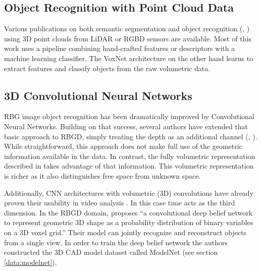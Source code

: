\documentclass[10pt,twocolumn,letterpaper]{article}
\begin{document}



\subsection{Object Recognition with Point Cloud Data}
Various publications on both semantic segmentation \cite{koppula2011semantic} and object recognition 
(\cite{teichman2011towards}, \cite{golovinskiy2009shape}) using 3D point clouds from LiDAR or RGBD sensors are available. 
Most of this work uses a pipeline combining hand-crafted features or descriptors with a machine learning classifier.
The VoxNet architecture on the other hand learns to extract features and classify objects from the raw volumetric data.


\subsection{3D  Convolutional Neural Networks}
RBG image object recognition has been dramatically improved by Convolutional Neural Networks.
Building on that success, several authors have extended that basic approach to RBGD, simply treating the depth as 
an additional channel (\cite{hoft2014fast}, \cite{socher2012convolutional}). While straightforward, this approach does not
make full use of the geometric information available in the data.
In contrast, the fully volumetric representation described in \cite{voxnet} takes advantage of that information.
This volumetric representation is richer as it also distinguishes free space from unknown space.

Additionally, CNN architectures with volumetric (3D) convolutions have already proven their usability in video analysis \cite{ji20133d}. In this
case time acts as the third dimension. 
In the RBGD domain, \cite{shape} proposes ``a convolutional deep belief network to represent geometric 3D shape as a probability distribution of binary variables on a 3D voxel grid.''
Their model can jointly recognize and reconstruct objects from a single view. In order to train the deep belief network the authors constructed the 
3D CAD model dataset called ModelNet (see section \ref{data:modelnet}).
\end{document}
